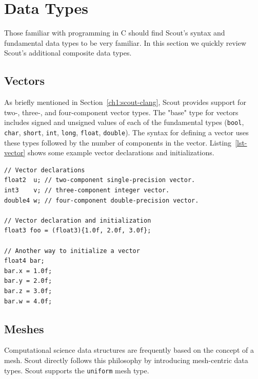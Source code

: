 \let\clearforchapter\par %


\chapter{Data Types}
\label{ch:datatypes}


Those familiar with programming in C should find Scout's syntax and fundamental data 
types to be very familiar.  In this section we quickly review Scout's additional composite data types.

\section{Vectors}
\label{ch:vectors}

As briefly mentioned in Section~\ref{ch1:scout-clang}, Scout provides support for two-, three-, 
and four-component vector types.  The "base" type for vectors includes signed and unsigned 
values of each of the fundamental types (\texttt{bool}, \texttt{char}, \texttt{short}, 
\texttt{int}, \texttt{long}, \texttt{float}, \texttt{double}).  The syntax for defining a 
vector uses these types followed by the number of components in the vector. Listing~\ref{lst-vector} 
shows some example vector declarations and initializations.

\par\bigskip
\begin{lstlisting}[float=h,label=lst-vector,
    caption={Vector declarations and initialization.}]
// Vector declarations
float2  u; // two-component single-precision vector.
int3    v; // three-component integer vector.
double4 w; // four-component double-precision vector.

// Vector declaration and initialization
float3 foo = (float3){1.0f, 2.0f, 3.0f};

// Another way to initialize a vector
float4 bar;
bar.x = 1.0f;
bar.y = 2.0f;
bar.z = 3.0f;
bar.w = 4.0f;
\end{lstlisting}
\par\bigskip\noindent

\section{Meshes}
\label{ch:meshes}

Computational science data structures are frequently based on the concept of a mesh.
Scout directly follows this philosophy by introducing mesh-centric data types.  Scout supports 
the \texttt{uniform} mesh type.  

